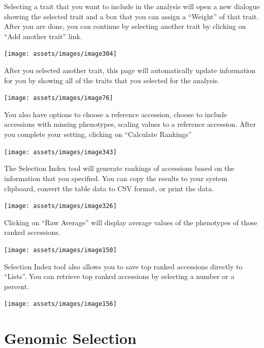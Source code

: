 \documentclass[
  12pt,
]{book}
\begin{document}
Selecting a trait that you want to include in the analysis will open a new dialogue showing the selected trait and a box that you can assign a ``Weight'' of that trait. After you are done, you can continue by selecting another trait by clicking on ``Add another trait'' link.

\begin{center}\texttt{[image: assets/images/image304]} \end{center}

After you selected another trait, this page will automatically update information for you by showing all of the traits that you selected for the analysis.

\begin{center}\texttt{[image: assets/images/image76]} \end{center}

You also have options to choose a reference accession, choose to include accessions with missing phenotypes, scaling values to a reference accession. After you complete your setting, clicking on ``Calculate Rankings''

\begin{center}\texttt{[image: assets/images/image343]} \end{center}

The Selection Index tool will generate rankings of accessions based on the information that you specified. You can copy the results to your system clipboard, convert the table data to CSV format, or print the data.

\begin{center}\texttt{[image: assets/images/image326]} \end{center}

Clicking on ``Raw Average'' will display average values of the phenotypes of those ranked accessions.

\begin{center}\texttt{[image: assets/images/image150]} \end{center}

Selection Index tool also allows you to save top ranked accessions directly to ``Lists''. You can retrieve top ranked accessions by selecting a number or a percent.

\begin{center}\texttt{[image: assets/images/image156]} \end{center}

\hypertarget{genomic-selection}{%
\section{Genomic Selection}\label{genomic-selection}}
\end{document}
